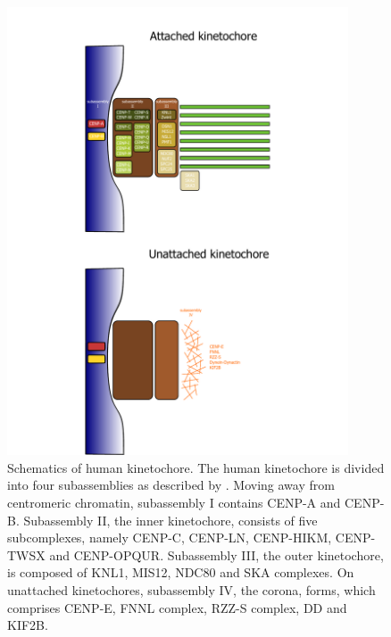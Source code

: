 \begin{figure}[htbp]
  \centering
  \includegraphics[width=0.9\textwidth]{chapter1/figures/kinetochore.pdf}
  \caption[Schematics of human kinetochore]{Schematics of human kinetochore. The human kinetochore is divided into four subassemblies as described by \cite{McAinsh2022TheKinetochores}. Moving away from centromeric chromatin, subassembly I contains CENP-A and CENP-B. Subassembly II, the inner kinetochore, consists of five subcomplexes, namely CENP-C, CENP-LN, CENP-HIKM, CENP-TWSX and CENP-OPQUR. Subassembly III, the outer kinetochore, is composed of KNL1, MIS12, NDC80 and SKA complexes. On unattached kinetochores, subassembly IV, the corona, forms, which comprises CENP-E, FNNL complex, RZZ-S complex, DD and KIF2B. }
  \label{fig:KTSchematics}
\end{figure}

